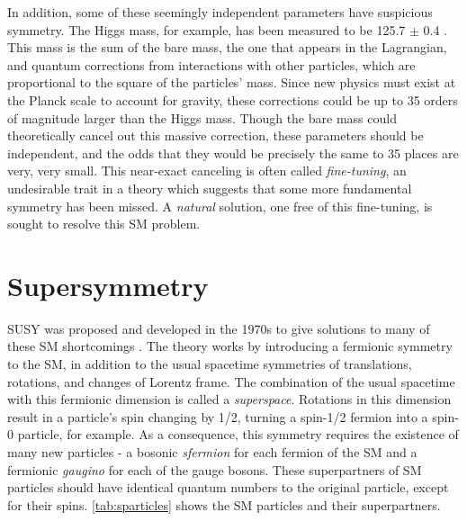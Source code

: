 In addition, some of these seemingly independent parameters have suspicious symmetry. The Higgs mass, for example, has been measured to be 125.7 $\pm$ 0.4 \gev \cite{Agashe:2014kda}. This mass is the sum of the bare mass, the one that appears in the Lagrangian, and quantum corrections from interactions with other particles, which are proportional to the square of the particles' mass. Since new physics must exist at the Planck scale to account for gravity, these corrections could be up to 35 orders of magnitude larger than the Higgs mass. Though the bare mass could theoretically cancel out this massive correction, these parameters should be independent, and the odds that they would be precisely the same to 35 places are very, very small. This near-exact canceling is often called \textit{fine-tuning}, an undesirable trait in a theory which suggests that some more fundamental symmetry has been missed. A \textit{natural} solution, one free of this fine-tuning, is sought to resolve this \ac{SM} problem. 


\section{Supersymmetry}

\acf{SUSY} was proposed and developed in the 1970s to give solutions to many of these \ac{SM} shortcomings \cite{WESS197439, 1971NuPhB..34..632G, 1971PhRvD...3.2415R}. The theory works by introducing a fermionic symmetry to the \ac{SM}, in addition to the usual spacetime symmetries of translations, rotations, and changes of Lorentz frame. The combination of the usual spacetime with this fermionic dimension is called a \textit{superspace}. Rotations in this dimension result in a particle's spin changing by 1/2, turning a spin-1/2 fermion into a spin-0 particle, for example. As a consequence, this symmetry requires the existence of many new particles - a bosonic \textit{sfermion} for each fermion of the \ac{SM} and a fermionic \textit{gaugino} for each of the gauge bosons. These superpartners of \ac{SM} particles should have identical quantum numbers to the original particle, except for their spins. \autoref{tab:sparticles} shows the \ac{SM} particles and their superpartners. 


